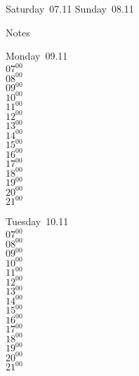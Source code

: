 \documentclass[11pt,a4paper]{book}\usepackage[]{graphicx}\usepackage[]{color}
\begin{document}
\begin{weekendbox}
  Saturday~07.11
  \tcblower
  Sunday~08.11
\end{weekendbox} %
\begin{notebox}
  Notes
\end{notebox}
\clearpage
\begin{headerbox}
\end{headerbox}
\begin{weekdaybox}
  Monday~09.11\\
  { 
  \vfill
  $07^{00}$\\
$08^{00}$\\
$09^{00}$\\
$10^{00}$\\
$11^{00}$\\
$12^{00}$\\
$13^{00}$\\
$14^{00}$\\
$15^{00}$\\
$16^{00}$\\
$17^{00}$\\
$18^{00}$\\
$19^{00}$\\
$20^{00}$\\
$21^{00}$\\
  }
\end{weekdaybox}
\begin{weekdaybox}
  Tuesday~10.11\\
  { 
  \vfill
  $07^{00}$\\
$08^{00}$\\
$09^{00}$\\
$10^{00}$\\
$11^{00}$\\
$12^{00}$\\
$13^{00}$\\
$14^{00}$\\
$15^{00}$\\
$16^{00}$\\
$17^{00}$\\
$18^{00}$\\
$19^{00}$\\
$20^{00}$\\
$21^{00}$\\
  }
\end{weekdaybox}
\end{document}
